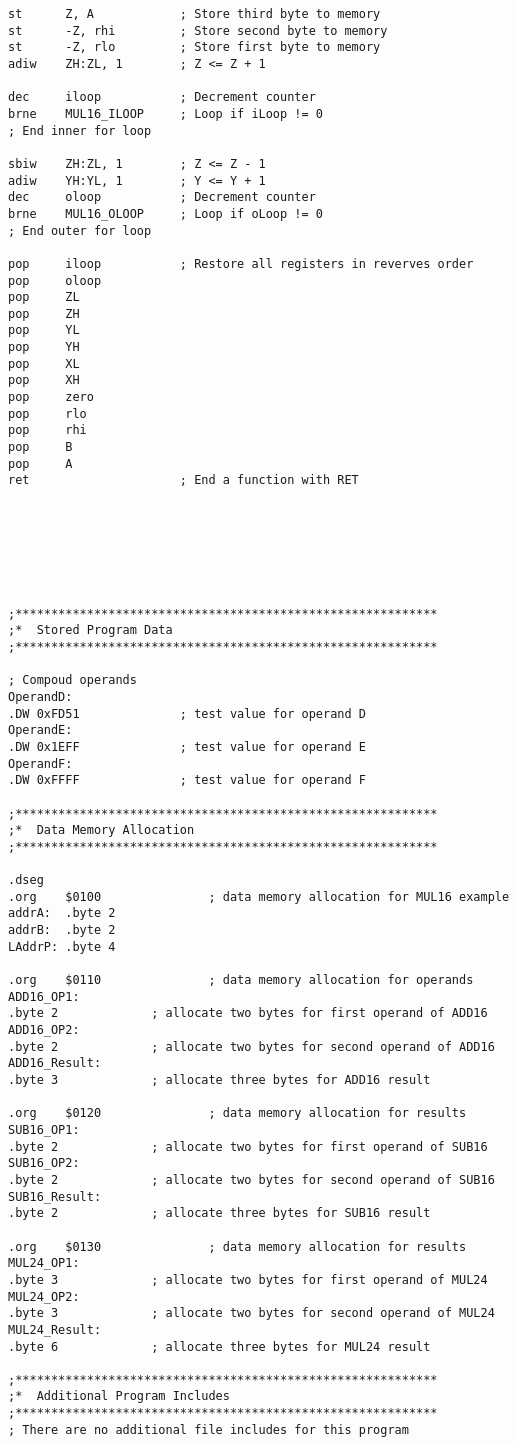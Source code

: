 \documentclass[12pt,letterpaper]{article}
\begin{document}
\begin{verbatim}
st		Z, A			; Store third byte to memory
st		-Z, rhi			; Store second byte to memory
st		-Z, rlo			; Store first byte to memory
adiw	ZH:ZL, 1		; Z <= Z + 1	

dec		iloop			; Decrement counter
brne	MUL16_ILOOP		; Loop if iLoop != 0
; End inner for loop

sbiw	ZH:ZL, 1		; Z <= Z - 1
adiw	YH:YL, 1		; Y <= Y + 1
dec		oloop			; Decrement counter
brne	MUL16_OLOOP		; Loop if oLoop != 0
; End outer for loop

pop		iloop			; Restore all registers in reverves order
pop		oloop
pop		ZL				
pop		ZH
pop		YL
pop		YH
pop		XL
pop		XH
pop		zero
pop		rlo
pop		rhi
pop		B
pop		A
ret						; End a function with RET







;***********************************************************
;*	Stored Program Data
;***********************************************************

; Compoud operands
OperandD:
.DW	0xFD51				; test value for operand D
OperandE:
.DW	0x1EFF				; test value for operand E
OperandF:
.DW	0xFFFF				; test value for operand F

;***********************************************************
;*	Data Memory Allocation
;***********************************************************

.dseg
.org	$0100				; data memory allocation for MUL16 example
addrA:	.byte 2
addrB:	.byte 2
LAddrP:	.byte 4

.org	$0110				; data memory allocation for operands
ADD16_OP1:
.byte 2				; allocate two bytes for first operand of ADD16
ADD16_OP2:
.byte 2				; allocate two bytes for second operand of ADD16
ADD16_Result:
.byte 3				; allocate three bytes for ADD16 result

.org	$0120				; data memory allocation for results
SUB16_OP1:
.byte 2				; allocate two bytes for first operand of SUB16
SUB16_OP2:
.byte 2				; allocate two bytes for second operand of SUB16
SUB16_Result:
.byte 2				; allocate three bytes for SUB16 result

.org	$0130				; data memory allocation for results
MUL24_OP1:
.byte 3				; allocate two bytes for first operand of MUL24
MUL24_OP2:
.byte 3				; allocate two bytes for second operand of MUL24
MUL24_Result:
.byte 6				; allocate three bytes for MUL24 result

;***********************************************************
;*	Additional Program Includes
;***********************************************************
; There are no additional file includes for this program
	\end{verbatim}
	
	
	
	
\end{document}
